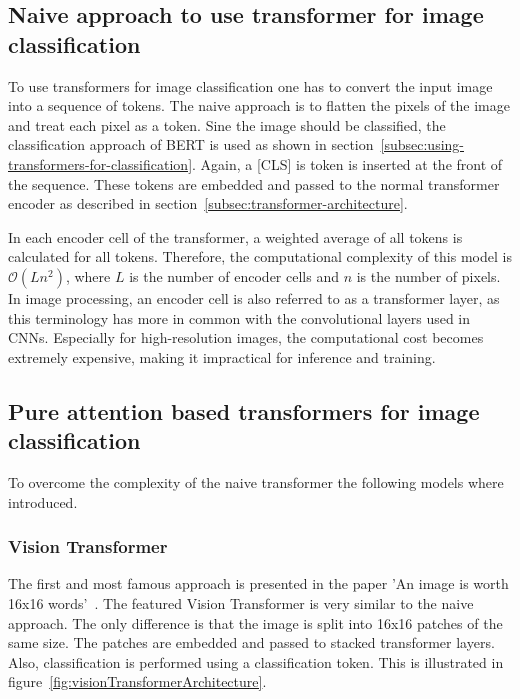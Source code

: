 \documentclass[a4paper]{scrartcl}
\begin{document}
    \subsection{Naive approach to use transformer for image classification}\label{subsec:naive-transformer}
    To use transformers for image classification one has to convert the input image into a sequence of tokens.
    The naive approach is to flatten the pixels of the image and treat each pixel as a token.
    Sine the image should be classified, the classification approach of BERT is used as shown in section~\ref{subsec:using-transformers-for-classification}.
    Again, a [CLS] is token is inserted at the front of the sequence.
    These tokens are embedded and passed to the normal transformer encoder as described in section~\ref{subsec:transformer-architecture}.

    In each encoder cell of the transformer, a weighted average of all tokens is calculated for all tokens.
    Therefore, the computational complexity of this model is $\mathcal{O}(Ln^2)$, where $L$ is the number of encoder cells and $n$ is the number of pixels.
    In image processing, an encoder cell is also referred to as a transformer layer, as this terminology has more in common with the convolutional layers used in CNNs.
    Especially for high-resolution images, the computational cost becomes extremely expensive, making it impractical for inference and training.

    \subsection{Pure attention based transformers for image classification}
    To overcome the complexity of the naive transformer the following models where introduced.

    \subsubsection{Vision Transformer}\label{subsubsec:vision-transformer}
    The first and most famous approach is presented in the paper 'An image is worth 16x16 words'~\cite{dosovitskiy2021image}.
    The featured Vision Transformer is very similar to the naive approach.
    The only difference is that the image is split into 16x16 patches of the same size.
    The patches are embedded and passed to stacked transformer layers.
    Also, classification is performed using a classification token.
    This is illustrated in figure~\ref{fig:visionTransformerArchitecture}.
\end{document}
